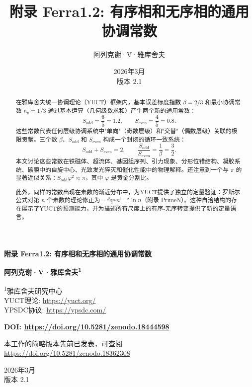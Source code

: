 \documentclass[12pt,a4paper]{article}
\title{附录 Ferra1.2: 有序相和无序相的通用协调常数}
\author{阿列克谢·V·雅库舍夫}
\date{2026年3月 \\ 版本 2.1}
\begin{document}
	
	\begin{titlepage}
		\begin{center}
			\vspace*{1cm}
			\Huge\textbf{附录 Ferra1.2: 有序相和无序相的通用协调常数}
			\vspace{1cm}
			
			\Large\textbf{阿列克谢·V·雅库舍夫\textsuperscript{1}}
			\vspace{0.5cm}
			
			\large
			\textsuperscript{1}雅库舍夫研究中心 \\
			YUCT理论: \url{https://yuct.org/} \\
			YPSDC协议: \url{https://ypsdc.com/}
			\vspace{1cm}
			
			\textbf{DOI: \url{https://doi.org/10.5281/zenodo.18444598}}
			\vspace{1cm}
			
			\large
			本工作的简略版本先前已发表，可查阅 \\
			\url{https://doi.org/10.5281/zenodo.18362308}
			\vspace{1cm}
			
			\large
			2026年3月 \\ \large 版本 2.1
			\vspace{1cm}
			
			\begin{minipage}{0.9\textwidth}
				\begin{abstract}
					\noindent
					在雅库舍夫统一协调理论（YUCT）框架内，基本误差标度指数 \(\beta = 2/3\) 和最小协调常数 \(\kappa_c = 1/3\) 通过基本运算（几何级数求和）产生两个新的通用常数：
					\[
					S_{\text{odd}} = \frac{6}{5}=1.2,\qquad S_{\text{even}} = \frac{4}{5}=0.8.
					\]
					这些常数代表任何层级协调系统中"单向"（奇数层级）和"交替"（偶数层级）关联的极限贡献。三个数 \(\beta\)、\(S_{\text{odd}}\) 和 \(S_{\text{even}}\) 构成一个封闭的循环一致系统：
					\[
					S_{\text{odd}}+S_{\text{even}} = 2,\qquad \frac{S_{\text{odd}}}{S_{\text{even}}} = \frac{1}{\beta} = \frac{3}{2}.
					\]
					本文讨论这些常数在铁磁体、超流体、基因组序列、引力现象、分形位错结构、凝胶系统、碳膜中的自旋中心、光致发光猝灭和催化性能中的物理解释。还注意到一个与 \(\pi\) 的显著近似关系：\(S_{\text{odd}}\varphi^2 \approx \pi\)，其中 \(\varphi\) 是黄金分割比。 
					
					此外，同样的常数出现在素数的渐近分布中，为YUCT提供了独立的定量验证：罗斯尔公式对第 \(n\) 个素数的理论修正为 \(-\frac{S_{\text{even}}}{2}n^{1-\beta}\ln n\)（附录 PrimeN）。这种自洽结构的存在展示了YUCT的预测能力，并为描述所有尺度上的有序-无序转变提供了新的定量语言。
				\end{abstract}
			\end{minipage}
			

\end{center}
\end{titlepage}
\end{document}
